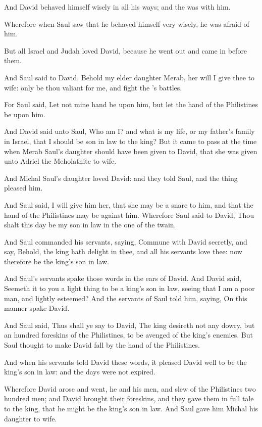 \Verse And David behaved himself wisely in all his ways; and the \LORD was with him.

\Verse Wherefore when Saul saw that he behaved himself very wisely, he was afraid of him.

\Verse But all Israel and Judah loved David, because he went out and came in before them.

\Verse And Saul said to David, Behold my elder daughter Merab, her will I give thee to wife: only be thou valiant for me, and fight the \LORD's battles.

For Saul said, Let not mine hand be upon him, but let the hand of the Philistines be upon him.

\Verse And David said unto Saul, Who am I? and what is my life, or my father's family in Israel, that I should be son in law to the king?  \Verse But it came to pass at the time when Merab Saul's daughter should have been given to David, that she was given unto Adriel the Meholathite to wife.

\Verse And Michal Saul's daughter loved David: and they told Saul, and the thing pleased him.

\Verse And Saul said, I will give him her, that she may be a snare to him, and that the hand of the Philistines may be against him.  Wherefore Saul said to David, Thou shalt this day be my son in law in the one of the twain.

\Verse And Saul commanded his servants, saying, Commune with David secretly, and say, Behold, the king hath delight in thee, and all his servants love thee: now therefore be the king's son in law.

\Verse And Saul's servants spake those words in the ears of David. And David said, Seemeth it to you a light thing to be a king's son in law, seeing that I am a poor man, and lightly esteemed?  \Verse And the servants of Saul told him, saying, On this manner spake David.

\Verse And Saul said, Thus shall ye say to David, The king desireth not any dowry, but an hundred foreskins of the Philistines, to be avenged of the king's enemies. But Saul thought to make David fall by the hand of the Philistines.

\Verse And when his servants told David these words, it pleased David well to be the king's son in law: and the days were not expired.

\Verse Wherefore David arose and went, he and his men, and slew of the Philistines two hundred men; and David brought their foreskins, and they gave them in full tale to the king, that he might be the king's son in law. And Saul gave him Michal his daughter to wife.

